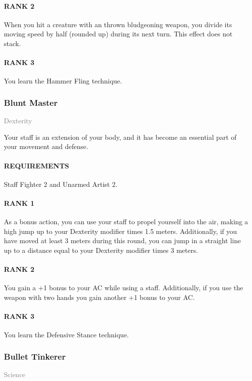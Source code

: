 \paragraph{RANK 2} When you hit a creature with an thrown bludgeoning weapon, you divide its moving speed by half (rounded up) during its next turn.
This effect does not stack.
\paragraph{RANK 3} You learn the Hammer Fling technique.

\subsubsection{Blunt Master} \label{feat::bluntmaster}
\small{\textcolor{gray}{Dexterity}}

\normalsize
Your staff is an extension of your body, and it has become an essential part of your movement and defense.
\paragraph{REQUIREMENTS} Staff Fighter 2 and Unarmed Artist 2.
\paragraph{RANK 1} As a bonus action, you can use your staff to propel yourself into the air, making a high jump up to your Dexterity modifier times 1.5 meters.
Additionally, if you have moved at least 3 meters during this round, you can jump in a straight line up to a distance equal to your Dexterity modifier times 3 meters.
\paragraph{RANK 2} You gain a +1 bonus to your AC while using a staff.
Additionally, if you use the weapon with two hands you gain another +1 bonus to your AC.
\paragraph{RANK 3} You learn the Defensive Stance technique.

\subsubsection{Bullet Tinkerer} \label{feat::bullettinkerer}
\small{\textcolor{gray}{Science}}

